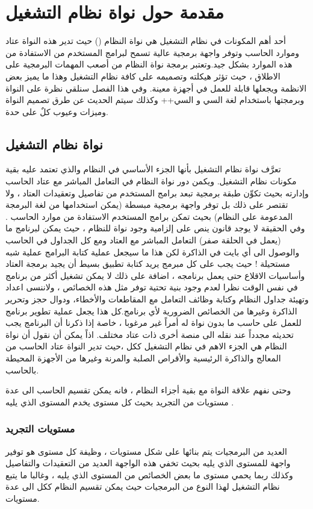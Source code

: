 \documentclass[document.tex]{subfiles}
\begin{document}
\chapter{مقدمة حول نواة نظام التشغيل}
أحد أهم المكونات في نظام التشغيل هي نواة النظام () حيث تدير هذه النواة عتاد وموارد الحاسب وتوفر واجهة برمجية عالية تسمح لبرامج المستخدم من الاستفادة من هذه الموارد  بشكل جيد.وتعتبر برمجة نواة النظام من أصعب المهمات البرمجية على الاطلاق ، حيث تؤثر هيكلته وتصميمه على كافة نظام التشغيل وهذا ما يميز بعض الانظمة ويجعلها قابلة للعمل في أجهزة معينة.
وفي هذا الفصل سنلقي نظرة على النواة وبرمجتها باستخدام لغة السي و السي++ وكذلك سيتم الحديث عن طرق تصميم النواة  وميزات وعيوب كلٌ على حدة.

\section{نواة نظام التشغيل}
تعرَّف نواة نظام التشغيل بأنها الجزء الأساسي في النظام والذي تعتمد عليه بقية مكونات نظام التشغيل. ويكمن دور نواة النظام في التعامل المباشر مع عتاد الحاسب وإدارته بحيث تكوِّن طبقة برمجية تبعد برامج المستخدم من تفاصيل وتعقيدات العتاد ، ولا تقتصر على ذلك بل توفر واجهة برمجية مبسطة (يمكن استخدامها من لغة البرمجة المدعومة على النظام) بحيث تمكن برامج المستخدم الاستفادة من موارد الحاسب . وفي الحقيقة لا يوجد قانون ينص على إلزامية وجود نواة للنظام ، حيث يمكن لبرنامج ما (يعمل في الحلقة صفر) التعامل المباشر مع العتاد ومع كل الجداول في الحاسب والوصول الى أي بايت في الذاكرة لكن هذا ما سيجعل عملية كتابة البرامج عملية شبه مستحيلة ! حيث يجب على كل مبرمج يريد كتابة تطبيق بسيط أن يجيد برمجة العتاد وأساسيات الاقلاع حتى يعمل برنامجه ، اضافة على ذلك لا يمكن تشغيل أكثر من برنامج في نفس الوقت نظرا لعدم وجود بنية تحتية توفر مثل هذه الخصائص ، ولاننسى اعداد وتهيئة جداول النظام وكتابة وظائف التعامل مع المقاطعات والأخطاء، ودوال حجز وتحرير الذاكرة وغيرها من الخصائص الضرورية لأي برنامج.كل هذا يجعل عملية تطوير برنامج للعمل على حاسب ما بدون نواة له أمراً غير مرغوبا ، خاصة إذا ذكرنا أن البرنامج يجب تحديثه مجدداً عند نقله الى منصة أخرى ذات عتاد مختلف. اذاً يمكن أن نقول أن نواة النظام هي الجزء الاهم في نظام التشغيل ككل ،حيث تدير النواة عتاد الحاسب من المعالج والذاكرة الرئيسية والأقراص الصلبة والمرنة وغيرها من الأجهزة المحيطة بالحاسب.

وحتى نفهم علاقة النواة مع بقية أجزاء النظام ، فانه يمكن تقسيم الحاسب الى عدة مستويات من التجريد بحيث كل مستوى يخدم المستوى الذي يليه .

\subsection{مستويات التجريد}
العديد من البرمجيات يتم بنائها على شكل مستويات ، وظيفة كل مستوى هو توفير واجهة للمستوى الذي يليه بحيث تخفي هذه الواجهة العديد من التعقيدات والتفاصيل وكذلك ربما يحمي مستوى ما بعض الخصائص من المستوى الذي يليه ، وغالبا ما يتبع نظام التشغيل لهذا النوع من البرمجيات حيث يمكن تقسيم النظام ككل الى عدة مستويات.
\end{document}
